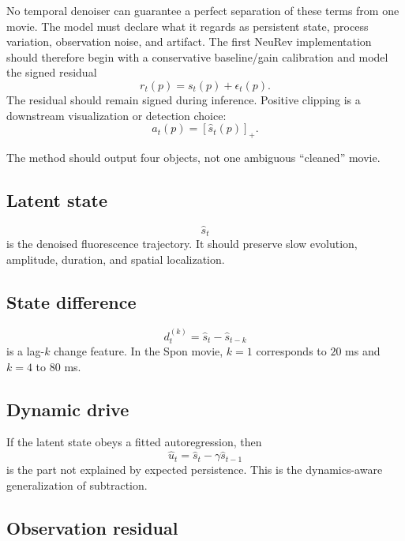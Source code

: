 \documentclass[11pt]{article}
\newcommand{\pos}[1]{\left[#1\right]_+}
\begin{document}
No temporal denoiser can guarantee a perfect separation of these terms from one
movie. The model must declare what it regards as persistent state, process
variation, observation noise, and artifact. The first NeuRev implementation
should therefore begin with a conservative baseline/gain calibration and model
the signed residual
\begin{equation}
r_t(p)=s_t(p)+\epsilon_t(p).
\label{eq:residual-model}
\end{equation}
The residual should remain signed during inference. Positive clipping is a
downstream visualization or detection choice:
\begin{equation}
a_t(p)=\pos{\widehat s_t(p)}.
\end{equation}

The method should output four objects, not one ambiguous ``cleaned'' movie.

\subsection{Latent state}

\begin{equation}
\widehat s_t
\end{equation}
is the denoised fluorescence trajectory. It should preserve slow evolution,
amplitude, duration, and spatial localization.

\subsection{State difference}

\begin{equation}
d_t^{(k)}
=
\widehat s_t-\widehat s_{t-k}
\end{equation}
is a lag-\(k\) change feature. In the Spon movie, \(k=1\) corresponds to
\(20\) ms and \(k=4\) to \(80\) ms.

\subsection{Dynamic drive}

If the latent state obeys a fitted autoregression, then
\begin{equation}
\widehat u_t
=
\widehat s_t-\gamma\widehat s_{t-1}
\label{eq:drive}
\end{equation}
is the part not explained by expected persistence. This is the
dynamics-aware generalization of subtraction.

\subsection{Observation residual}
\end{document}
